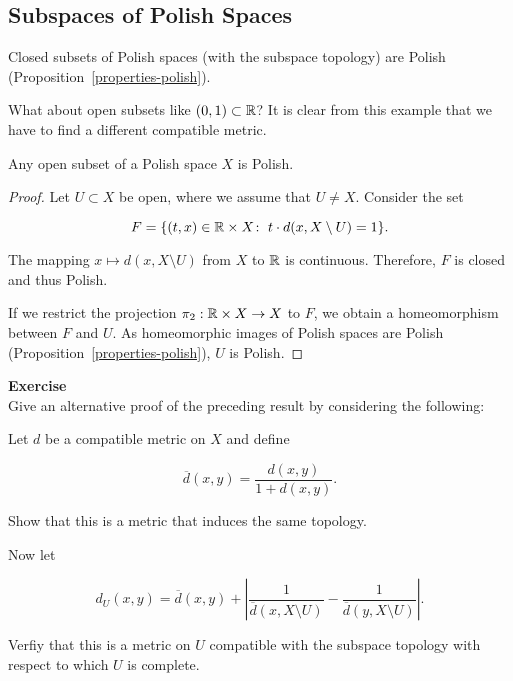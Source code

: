 \subsection{Subspaces of Polish Spaces}

Closed subsets of Polish spaces (with the subspace topology) are Polish (Proposition~\ref{properties-polish}).

What about open subsets like $(0,1) \subset \mathbb{R}$? It is clear from this example that we have to find a different compatible metric.

\begin{proposition}\label{prop-open-subset-polish}Any open subset of a Polish space $X$ is Polish.

\end{proposition}\begin{proof}Let $U \subset X$ be open, where we assume that $U \neq X$.  Consider the set

\begin{equation}
F = \{(t,x) \in \mathbb{R} \times X \colon \; t \cdot d(x,X\setminus U) =1 \}.
\end{equation}

The mapping $x \mapsto d(x,X\setminus U)$ from $X$ to $\mathbb{R}$ is continuous. Therefore, $F$ is closed and thus Polish.

If we restrict the projection $\pi_2: \mathbb{R} \times X \to X$ to $F$, we obtain a homeomorphism between $F$ and $U$. As homeomorphic images of Polish spaces are Polish (Proposition~\ref{properties-polish}), $U$ is Polish.

\end{proof}\begin{framed}
\textbf{Exercise}\\
Give an alternative proof of the preceding result by considering the following:

Let $d$ be a compatible metric on $X$ and define

\begin{equation}
\overline{d}(x,y) = \frac{d(x,y)}{1+d(x,y)}.
\end{equation}

Show that this is a metric that induces the same topology.

Now let

\begin{equation}
d_U(x,y) = \overline{d}(x,y) + \left | \frac{1}{\overline{d}(x,X\setminus U)} - \frac{1}{\overline{d}(y,X\setminus U)} \right|.
\end{equation}

Verfiy that this is a metric on $U$ compatible with the subspace topology
with respect to which $U$ is complete.
\end{framed}

